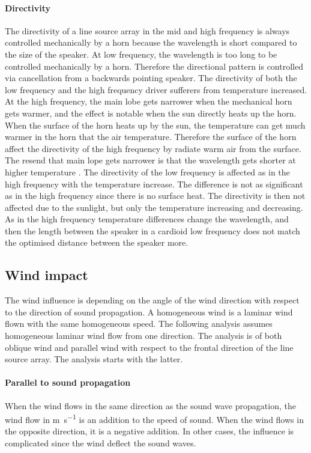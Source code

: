 \paragraph{Directivity} The directivity of a line source array in the mid and high frequency is always controlled mechanically by a horn because the wavelength is short compared to the size of the speaker. At low frequency, the wavelength is too long to be controlled mechanically by a horn. Therefore the directional pattern is controlled via cancellation from a backwards pointing speaker. The directivity of both the low frequency and the high frequency driver sufferers from temperature increased. At the high frequency, the main lobe gets narrower when the mechanical horn gets warmer, and the effect is notable when the sun directly heats up the horn. When the surface of the horn heats up by the sun, the temperature can get much warmer in the horn that the air temperature. Therefore the surface of the horn affect the directivity of the high frequency by radiate warm air from the surface. The resend that main lope gets narrower is that the wavelength gets shorter at higher temperature \citep{levine2018influence}. The directivity of the low frequency is affected as in the high frequency with the temperature increase. The difference is not as significant as in the high frequency since there is no surface heat. The directivity is then not affected due to the sunlight, but only the temperature increasing and decreasing. As in the high frequency temperature differences change the wavelength, and then the length between the speaker in a cardioid low frequency does not match the optimised distance between the speaker more. 



\subsection{Wind impact}
The wind influence is depending on the angle of the wind direction with respect to the direction of sound propagation. A homogeneous wind is a laminar wind flown with the same homogeneous speed. The following analysis assumes homogeneous laminar wind flow from one direction. The analysis is of both oblique wind and parallel wind with respect to the frontal direction of the line source array. The analysis starts with the latter. 

\paragraph{Parallel to sound propagation} When the wind flows in the same direction as the sound wave propagation, the wind flow in \si{\meter\per\second} is an addition to the speed of sound. When the wind flows in the opposite direction, it is a negative addition.  In other cases, the influence is complicated since the wind deflect the sound waves.


